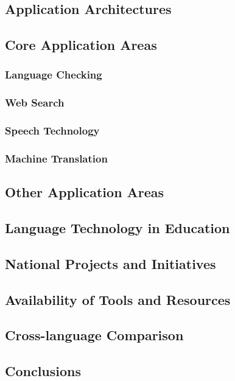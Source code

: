\documentclass[]{../metanetpaper}
\begin{document}
\begin{multicols}{2}

\subsection{Application Architectures}

\subsection{Core Application Areas}
\subsubsection{Language Checking}

\subsubsection{Web Search}

\subsubsection{Speech Technology}

\subsubsection{Machine Translation}

\subsection{Other Application Areas}

\subsection{Language Technology in Education}

\subsection{National Projects and Initiatives}

\subsection{Availability of Tools and Resources}

\subsection{Cross-language Comparison}

\subsection{Conclusions}

\end{multicols}
\end{document}
